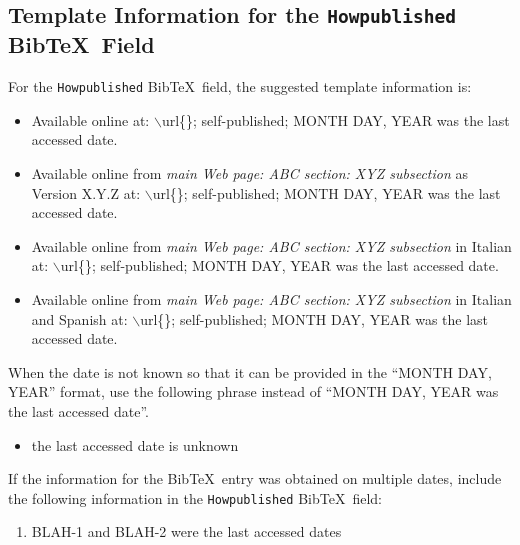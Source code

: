 \documentclass[letter,12pt]{article}
\begin{document}
\subsection{Template Information for the {\tt Howpublished} {\sc Bib}\TeX\ Field}
\label{ssec:TemplateInformationForTheHowpublishedBibTeXField}

For the {\tt Howpublished} {\sc Bib}\TeX\ field, the suggested template information is: \vspace{-0.3cm}
\begin{itemize} \itemsep -4pt
\item Available online at: $\backslash$url\{\}; self-published; MONTH DAY, YEAR was the last accessed date.
\item Available online from {\it main Web page: ABC section: XYZ subsection} as Version X.Y.Z at: $\backslash$url\{\}; self-published; MONTH DAY, YEAR was the last accessed date.
\item Available online from {\it main Web page: ABC section: XYZ subsection} in Italian at: $\backslash$url\{\}; self-published; MONTH DAY, YEAR was the last accessed date.
\item Available online from {\it main Web page: ABC section: XYZ subsection} in Italian and Spanish at: $\backslash$url\{\}; self-published; MONTH DAY, YEAR was the last accessed date.
\end{itemize}

When the date is not known so that it can be provided in the ``MONTH DAY, YEAR'' format, use the following phrase instead of ``MONTH DAY, YEAR was the last accessed date''. \vspace{-0.3cm}
\begin{itemize} \itemsep -4pt
\item the last accessed date is unknown
\end{itemize}


If the information for the {\sc Bib}\TeX\ entry was obtained on multiple dates, include the following information in the {\tt Howpublished} {\sc Bib}\TeX\ field: \vspace{-0.3cm}
\begin{enumerate} \itemsep -4pt
\item BLAH-1 and BLAH-2 were the last accessed dates
\end{enumerate}








\end{document}
